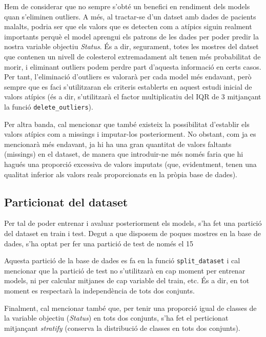 Hem de considerar que no sempre s'obté un benefici en rendiment dels models quan s'eliminen outliers. A més, al tractar-se d'un datset amb dades de pacients malalts, podria ser que els valors que es detecten com a atípics siguin realment importants perquè el model aprengui els patrons de les dades per poder predir la nostra variable objectiu \textit{Status}. És a dir, segurament, totes les mostres del datset que contenen un nivell de colesterol extremadament alt tenen més probabilitat de morir, i eliminant outliers podem perdre part d'aquesta informació en certs casos. Per tant, l'eliminació d'outliers es valorarà per cada model més endavant, però sempre que es faci s'utilitzaran els criteris establerts en aquest estudi inicial de valors atípics (és a dir, s'utilitzarà el factor multiplicatiu del IQR de 3 mitjançant la funció \texttt{delete\_outliers}).

Per altra banda, cal mencionar que també existeix la possibilitat d'establir els valors atípics com a missings i imputar-los posteriorment. No obstant, com ja es mencionarà més endavant, ja hi ha una gran quantitat de valors faltants (missings) en el dataset, de manera que introduir-ne més només faria que hi hagués una proporció excessiva de valors imputats (que, evidentment, tenen una qualitat inferior als valors reals proporcionats en la pròpia base de dades).

\subsection{Particionat del dataset}
Per tal de poder entrenar i avaluar posteriorment els models, s'ha fet una partició del dataset en train i test. Degut a que disposem de poques mostres en la base de dades, s'ha optat per fer una partició de test de només el 15%

Aquesta partició de la base de dades es fa en la funció \texttt{split\_dataset} i cal mencionar que la partició de test no s'utilitzarà en cap moment per entrenar models, ni per calcular mitjanes de cap variable del train, etc. És a dir, en tot moment es respectarà la independència de tots dos conjunts.

Finalment, cal mencionar també que, per tenir una proporció igual de classes de la variable objectiu (\textit{Status}) en tots dos conjunts, s'ha fet el perticionat mitjançant \textit{stratify} (conserva la distribució de classes en tots dos conjunts).

